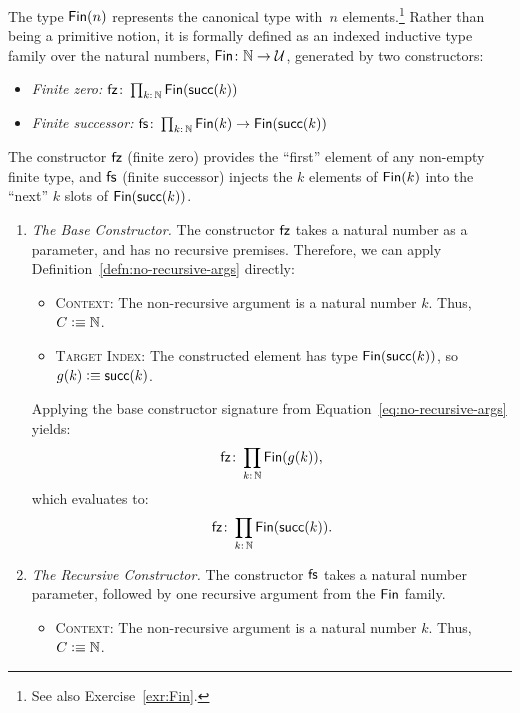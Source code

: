 \begin{xmpl}\label{xmpl:Fin}
    The type $\mathsf{Fin}(n)$ represents the canonical type with~$n$ elements.\footnote{See also Exercise~\ref{exr:Fin}.} Rather than being a primitive notion, it is formally defined as an indexed inductive type family over the natural numbers, $\fun{Fin}\colon\N\to\univ$, generated by two constructors:
    \begin{itemize}
    \item \textsl{Finite zero:} $\fun{fz}\colon\prod_{k\colon\N}\fun{Fin}(\fun{succ}(k))$
    
    \item \textsl{Finite successor:} $\fun{fs}\colon\prod_{k\colon\N}\fun{Fin}(k)\to\fun{Fin}(\fun{succ}(k))$
    \end{itemize}
    The constructor $\mathsf{fz}$ (finite zero) provides the ``first'' element of any non-empty finite type, and $\mathsf{fs}$ (finite successor) injects the $k$ elements of $\mathsf{Fin}(k)$ into the ``next'' $k$ slots of $\mathsf{Fin}(\mathsf{succ}(k))$.

    \begin{enumerate}
        \item \textit{The Base Constructor.} The constructor $\mathsf{fz}$ takes a natural number as a parameter, and has no recursive premises. Therefore, we can apply Definition~\ref{defn:no-recursive-args} directly:
        \begin{itemize}
        \item \textsc{Context:} The non-recursive argument is a natural number $k$. Thus, $C\mathrel{\vcentcolon}\equiv\mathbb{N}$.
        
        \item \textsc{Target Index:} The constructed element has type $\mathsf{Fin}(\mathsf{succ}(k))$, so $g(k)\mathrel{\vcentcolon}\equiv\mathsf{succ}(k)$.
        \end{itemize}
        Applying the base constructor signature from Equation~\eqref{eq:no-recursive-args} yields:
        \[
            \fun{fz}\colon\prod_{k\colon\N}\fun{Fin}(g(k)),
        \]
        which evaluates to:
        \[
            \fun{fz}\colon\prod_{k\colon\N}
                \fun{Fin}(\fun{succ}(k)).
        \]
    
        \item \textit{The Recursive Constructor.} The constructor $\mathsf{fs}$ takes a natural number parameter, followed by one recursive argument from the $\mathsf{Fin}$ family.
        \begin{itemize}
            \item \textsc{Context:} The non-recursive argument is a natural number $k$. Thus, $C\mathrel{\vcentcolon}\equiv\mathbb{N}$.
            

\end{itemize}
\end{enumerate}
\end{xmpl}
